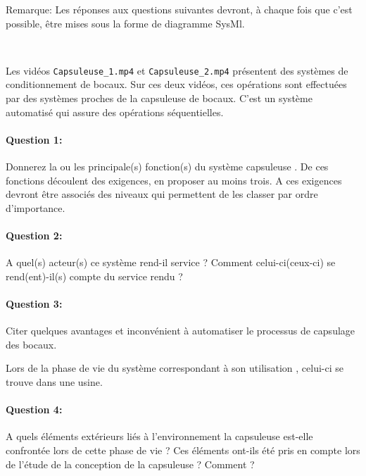 


Remarque: Les réponses aux questions suivantes devront, à chaque fois que c'est possible, être mises sous la forme de diagramme SysMl.


~\

Les vidéos \texttt{Capsuleuse\_1.mp4} et \texttt{Capsuleuse\_2.mp4} présentent des systèmes de conditionnement de bocaux. Sur ces deux vidéos, ces opérations sont effectuées par des systèmes proches de la capsuleuse de bocaux. C'est un système automatisé qui assure des opérations séquentielles.

\paragraph{Question 1:} Donnerez la ou les principale(s) fonction(s) du système \og capsuleuse \fg. De ces fonctions découlent des exigences, en proposer au moins trois. A ces exigences devront être associés des niveaux qui permettent de les classer par ordre d'importance.

\paragraph{Question 2:} A quel(s) acteur(s) ce système rend-il service ? Comment celui-ci(ceux-ci) se rend(ent)-il(s) compte du service rendu ?

\paragraph{Question 3:} Citer quelques avantages et inconvénient à automatiser le processus de capsulage des bocaux.


Lors de la phase de vie du système correspondant à son \og utilisation \fg, celui-ci se trouve dans une usine.

\paragraph{Question 4:} A quels éléments extérieurs liés à l'environnement la capsuleuse est-elle confrontée lors de cette phase de vie ? Ces éléments ont-ils été pris en compte lors de l'étude de la conception de la capsuleuse ? Comment ?

